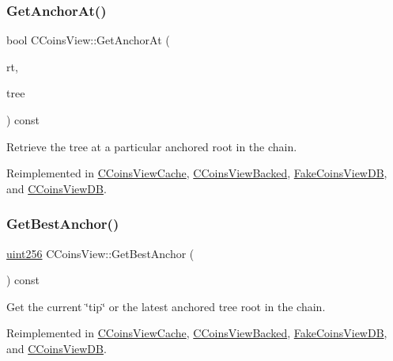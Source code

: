 \subsubsection{\texorpdfstring{Get\+Anchor\+At()}{GetAnchorAt()}}
{\footnotesize\ttfamily bool C\+Coins\+View\+::\+Get\+Anchor\+At (\begin{DoxyParamCaption}\item[{const \mbox{\hyperlink{classuint256}{uint256}} \&}]{rt,  }\item[{Z\+C\+Incremental\+Merkle\+Tree \&}]{tree }\end{DoxyParamCaption}) const\hspace{0.3cm}{\ttfamily [virtual]}}



Retrieve the tree at a particular anchored root in the chain. 



Reimplemented in \mbox{\hyperlink{class_c_coins_view_cache_a97401da3be42b24b16fc202cdce34419}{C\+Coins\+View\+Cache}}, \mbox{\hyperlink{class_c_coins_view_backed_a85e573aed0a7e713dc5d6a0478649435}{C\+Coins\+View\+Backed}}, \mbox{\hyperlink{class_fake_coins_view_d_b_ae52d0073bef3eb64bd64b325e821c52b}{Fake\+Coins\+View\+DB}}, and \mbox{\hyperlink{class_c_coins_view_d_b_aeaab3bc4b363dbbc9d9a77930209e299}{C\+Coins\+View\+DB}}.

\mbox{\label{class_c_coins_view_a4d51ab1de57e76a174b5ca874c601b52}} 
\subsubsection{\texorpdfstring{Get\+Best\+Anchor()}{GetBestAnchor()}}
{\footnotesize\ttfamily \mbox{\hyperlink{classuint256}{uint256}} C\+Coins\+View\+::\+Get\+Best\+Anchor (\begin{DoxyParamCaption}{ }\end{DoxyParamCaption}) const\hspace{0.3cm}{\ttfamily [virtual]}}



Get the current \char`\"{}tip\char`\"{} or the latest anchored tree root in the chain. 



Reimplemented in \mbox{\hyperlink{class_c_coins_view_cache_a8f1e864bff1617bae243bd0c7b29d2ed}{C\+Coins\+View\+Cache}}, \mbox{\hyperlink{class_c_coins_view_backed_a2bac0f246916a004e9773f03c37f2c82}{C\+Coins\+View\+Backed}}, \mbox{\hyperlink{class_fake_coins_view_d_b_af7870faf849e59188344273a03c9a1b0}{Fake\+Coins\+View\+DB}}, and \mbox{\hyperlink{class_c_coins_view_d_b_a2bb7d73a96472def92e332a4563a689c}{C\+Coins\+View\+DB}}.

